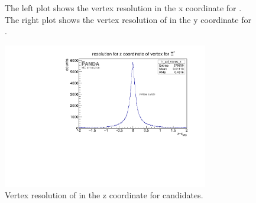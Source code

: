 		
		\begin{figure}
			\caption{\propose The left plot shows the vertex resolution in the x coordinate for \anticascade. The right plot shows the vertex
					 resolution of in the y coordinate for \anticascade.}
			\label{fig:xi_vtxres_xy}
			
		\end{figure}
		
		\begin{figure}
			\centering
			\includegraphics[width=0.8\textwidth]{./plots/Xi/XiPlus_vtxres_z.pdf}
			\caption{\propose Vertex resolution of in the z coordinate for \anticascade candidates.}
			\label{fig:xi_vtxres_z}
			
		\end{figure}
	
